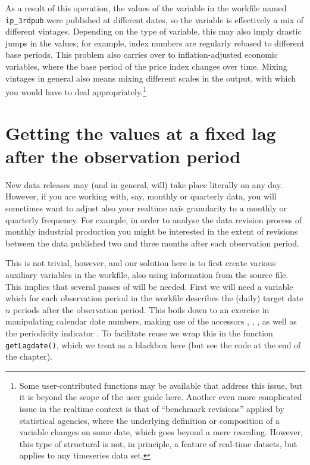 As a result of this operation, the values of the variable in the
 workfile named \texttt{ip\_3rdpub} were published at
different dates, so the variable is effectively a mix of different
vintages. Depending on the type of variable, this may also imply
drastic jumps in the values; for example, index numbers are regularly
rebased to different base periods. This problem also carries over to
inflation-adjusted economic variables, where the base period of the
price index changes over time. Mixing vintages in general also means
mixing different scales in the output, with which you would have to
deal appropriately.\footnote{Some user-contributed functions may be
  available that address this issue, but it is beyond the scope of the
  user guide here. Another even more complicated issue in the realtime
  context is that of ``benchmark revisions'' applied by statistical
  agencies, where the underlying definition or composition of a
  variable changes on some date, which goes beyond a mere
  rescaling. However, this type of structural is not, in principle, a
  feature of real-time datsets, but applies to any timeseries data
  set.}


\section{Getting the values at a fixed lag after the observation
  period}

New data releases may (and in general, will) take place literally on
any day. However, if you are working with, say, monthly or quarterly
data, you will sometimes want to adjust also your realtime axis
granularity to a monthly or quarterly frequency. For example, in order
to analyse the data revision process of monthly industrial production
you might be interested in the extent of revisions between the data
published two and three months after each observation period.

This is not trivial, however, and our solution here is to first create
various auxiliary variables in the  workfile, also using
information from the source file. This implies that several passes of
 will be needed. First we will need a variable which for
each observation period in the workfile describes the (daily) target
date $n$ periods after the observation period. This boils down to an
exercise in manipulating calendar date numbers, making use of the
 accessors , ,
, as well as the periodicity indicator .
To facilitate reuse we wrap this in the function
\texttt{getLagdate()}, which we treat as a blackbox here (but see the
code at the end of the chapter).

